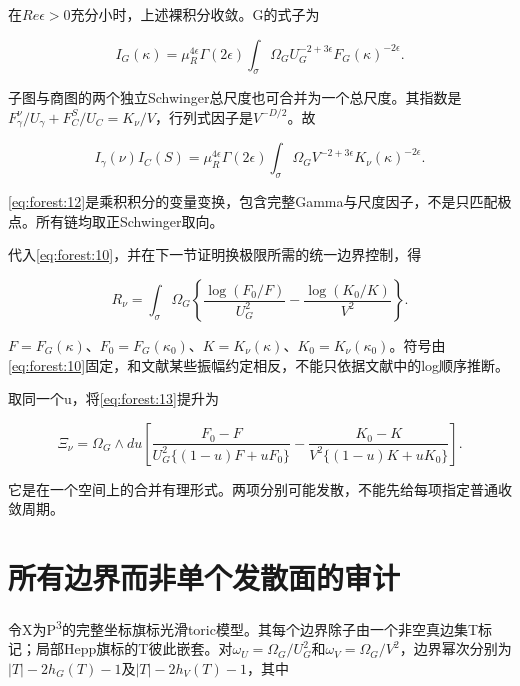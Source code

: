\documentclass[11pt,a4paper,oneside]{ctexrep}
\theoremstyle{cnplain}
\theoremstyle{definition}
\theoremstyle{remark}
\begin{document}
在\(Re \epsilon >0\)充分小时，上述裸积分收敛。G的式子为

\begin{equation}
I_G(\kappa)=\mu_R^{4\epsilon}\Gamma(2\epsilon)
             \int_\sigma \Omega_G
                  U_G^{-2+3\epsilon}F_G(\kappa)^{-2\epsilon}.    \label{eq:forest:11}
\end{equation}

子图与商图的两个独立Schwinger总尺度也可合并为一个总尺度。其指数是\(F_\gamma ^\nu/U_\gamma +F_C^S/U_C=K_\nu /V\)，行列式因子是\(V^{-D/2}\)。故

\begin{equation}
I_\gamma(\nu)I_C(S)=\mu_R^{4\epsilon}\Gamma(2\epsilon)
             \int_\sigma\Omega_G V^{-2+3\epsilon}
                                      K_\nu(\kappa)^{-2\epsilon}.          \label{eq:forest:12}
\end{equation}

\eqref{eq:forest:12}是乘积积分的变量变换，包含完整Gamma与尺度因子，不是只匹配极点。所有链均取正Schwinger取向。

代入\eqref{eq:forest:10}，并在下一节证明换极限所需的统一边界控制，得

\begin{equation}
R_\nu=\int_\sigma\Omega_G
 \left\{\frac{\log(F_0/F)}{U_G^2}
      -\frac{\log(K_0/K)}{V^2}\right\}.                         \label{eq:forest:13}
\end{equation}

\(F=F_G(\kappa )\)、\(F_0=F_G(\kappa _0)\)、\(K=K_\nu (\kappa )\)、\(K_0=K_\nu (\kappa _0)\)。符号由\eqref{eq:forest:10}固定，和文献某些振幅约定相反，不能只依据文献中的log顺序推断。

取同一个u，将\eqref{eq:forest:13}提升为

\begin{equation}
\Xi_\nu=\Omega_G\wedge du\left[
 \frac{F_0-F}{U_G^2\{(1-u)F+uF_0\}}
 -
 \frac{K_0-K}{V^2\{(1-u)K+uK_0\}}\right].                       \label{eq:forest:14}
\end{equation}

它是在一个空间上的合并有理形式。两项分别可能发散，不能先给每项指定普通收敛周期。

\section{所有边界而非单个发散面的审计}\label{sec:forest:4}

令X为P\textsuperscript{3}的完整坐标旗标光滑toric模型。其每个边界除子由一个非空真边集T标记；局部Hepp旗标的T彼此嵌套。对\(\omega _U=\Omega _G/U_G^{2}\)和\(\omega _V=\Omega _G/V^{2}\)，边界幂次分别为\(|T|- 2h_G(T)- 1\)及\(|T|- 2h_V(T)- 1\)，其中
\end{document}
